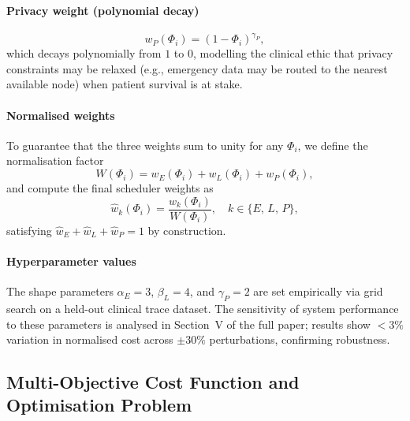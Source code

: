 \documentclass[journal,twoside,letterpaper]{IEEEtran}
\begin{document}
\paragraph{Privacy weight (polynomial decay)}
\begin{equation}
  w_P(\Phi_i) = (1 - \Phi_i)^{\gamma_P},
  \label{eq:weight_privacy}
\end{equation}
which decays polynomially from $1$ to $0$, modelling the clinical ethic that
privacy constraints may be relaxed (e.g., emergency data may be routed to
the nearest available node) when patient survival is at stake.

\paragraph{Normalised weights}

To guarantee that the three weights sum to unity for any $\Phi_i$, we define
the normalisation factor
\begin{equation}
  W(\Phi_i) = w_E(\Phi_i) + w_L(\Phi_i) + w_P(\Phi_i),
  \label{eq:weight_sum}
\end{equation}
and compute the final scheduler weights as
\begin{equation}
  \hat{w}_k(\Phi_i) = \frac{w_k(\Phi_i)}{W(\Phi_i)},
  \quad k \in \{E,\, L,\, P\},
  \label{eq:weight_normalised}
\end{equation}
satisfying $\hat{w}_E + \hat{w}_L + \hat{w}_P = 1$ by construction.

\paragraph{Hyperparameter values}

The shape parameters $\alpha_E = 3$, $\beta_L = 4$, and $\gamma_P = 2$ are
set empirically via grid search on a held-out clinical trace dataset.  The
sensitivity of system performance to these parameters is analysed in
Section~V of the full paper; results show $<\!3\%$ variation in normalised
cost across $\pm 30\%$ perturbations, confirming robustness.

\subsection{Multi-Objective Cost Function and Optimisation Problem}
\label{subsec:cost}
\end{document}
